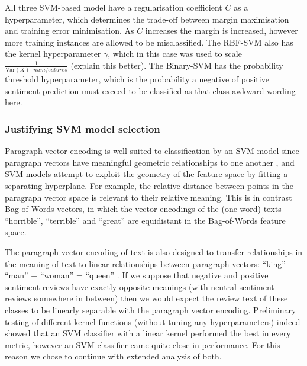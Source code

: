 \documentclass[11pt]{article}
\newcommand{\drafting}[1]{\textcolor{OliveGreen}{#1}}
\begin{document}
All three SVM-based model have a regularisation coefficient $C$ as a hyperparameter, which determines the trade-off between margin maximisation and training error minimisation. As $C$ increases the margin is increased, however more training instances are allowed to be misclassified. The RBF-SVM also has the kernel hyperparameter $\gamma$, which in this case was used to scale $\frac{1}{\textrm{Var}(X) \cdot numfeatures}$ (\drafting{explain this better}). The Binary-SVM has the probability threshold hyperparameter, which is the probability a negative of positive sentiment prediction must exceed to be classified as that class \drafting{awkward wording here}.

\subsubsection*{Justifying SVM model selection}
Paragraph vector encoding is well suited to classification by an SVM model since paragraph vectors have meaningful geometric relationships to one another \cite{le_distributed_2014}, and SVM models attempt to exploit the geometry of the feature space by fitting a separating hyperplane. For example, the relative distance between points in the paragraph vector space is relevant to their relative meaning. This is in contrast Bag-of-Words vectors, in which the vector encodings of the (one word) texts ``horrible'', ``terrible'' and ``great'' are equidistant in the Bag-of-Words feature space.

The paragraph vector encoding of text is also designed to transfer relationships in the meaning of text to linear relationships between paragraph vectors: ``king'' - ``man'' + ``woman'' = ``queen'' \cite{le_distributed_2014}. If we suppose that negative and positive sentiment reviews have exactly opposite meanings (with neutral sentiment reviews somewhere in between) then we would expect the review text of these classes to be linearly separable with the paragraph vector encoding. Preliminary testing of different kernel functions (without tuning any hyperparameters) indeed showed that an SVM classifier with a linear kernel performed the best in every metric, however an SVM classifier came quite close in performance. For this reason we chose to continue with extended analysis of both.
\end{document}
